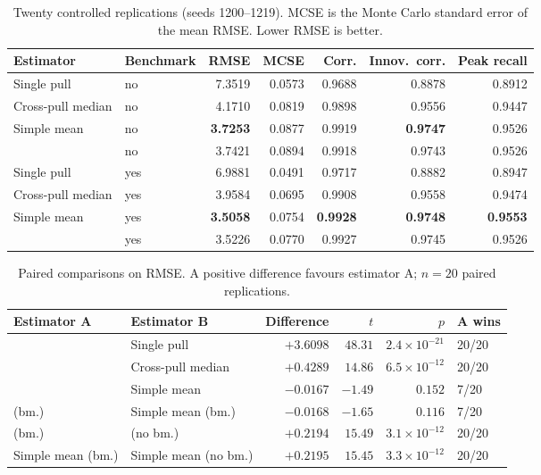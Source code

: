 \documentclass[12pt,a4paper,oneside]{article}
\begin{document}
\begin{table}[H]
\centering
\small
\caption{Twenty controlled replications (seeds 1200--1219). MCSE is the Monte
Carlo standard error of the mean RMSE. Lower RMSE is better.}
\label{tab:mc}
\begin{tabular}{llrrrrr}
\toprule
Estimator & Benchmark & RMSE & MCSE & Corr. & Innov.\ corr. & Peak recall\\
\midrule
Single pull        & no  & 7.3519 & 0.0573 & 0.9688 & 0.8878 & 0.8912\\
Cross-pull median  & no  & 4.1710 & 0.0819 & 0.9898 & 0.9556 & 0.9447\\
Simple mean        & no  & \textbf{3.7253} & 0.0877 & 0.9919 & \textbf{0.9747} & 0.9526\\
\RACER{}           & no  & 3.7421 & 0.0894 & 0.9918 & 0.9743 & 0.9526\\
\midrule
Single pull        & yes & 6.9881 & 0.0491 & 0.9717 & 0.8882 & 0.8947\\
Cross-pull median  & yes & 3.9584 & 0.0695 & 0.9908 & 0.9558 & 0.9474\\
Simple mean        & yes & \textbf{3.5058} & 0.0754 & \textbf{0.9928} & \textbf{0.9748} & \textbf{0.9553}\\
\RACER{}           & yes & 3.5226 & 0.0770 & 0.9927 & 0.9745 & 0.9526\\
\bottomrule
\end{tabular}
\end{table}

\begin{table}[H]
\centering
\small
\caption{Paired comparisons on RMSE. A positive difference favours estimator A;
$n=20$ paired replications.}
\label{tab:mcpaired}
\begin{tabular}{llrrrl}
\toprule
Estimator A & Estimator B & Difference & $t$ & $p$ & A wins\\
\midrule
\RACER{} & Single pull & $+3.6098$ & $48.31$ & $2.4\times10^{-21}$ & 20/20\\
\RACER{} & Cross-pull median & $+0.4289$ & $14.86$ & $6.5\times10^{-12}$ & 20/20\\
\RACER{} & Simple mean & $-0.0167$ & $-1.49$ & $0.152$ & 7/20\\
\RACER{} (bm.) & Simple mean (bm.) & $-0.0168$ & $-1.65$ & $0.116$ & 7/20\\
\RACER{} (bm.) & \RACER{} (no bm.) & $+0.2194$ & $15.49$ & $3.1\times10^{-12}$ & 20/20\\
Simple mean (bm.) & Simple mean (no bm.) & $+0.2195$ & $15.45$ & $3.3\times10^{-12}$ & 20/20\\
\bottomrule
\end{tabular}
\end{table}
\end{document}
